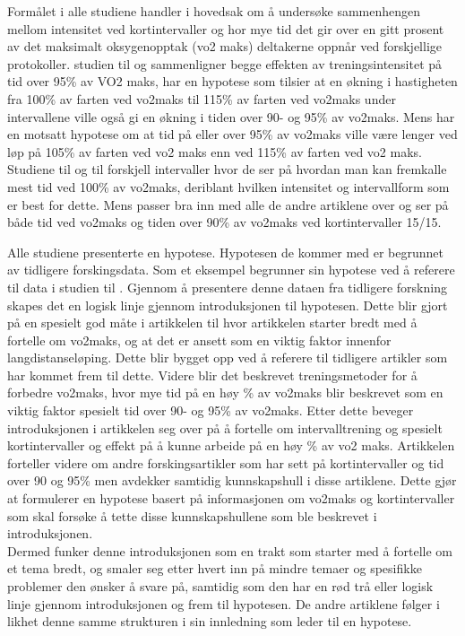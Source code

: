 \documentclass[
]{book}
\begin{document}
Formålet i alle studiene handler i hovedsak om å undersøke sammenhengen mellom intensitet ved kortintervaller og hor mye tid det gir over en gitt prosent av det maksimalt oksygenopptak (vo2 maks) deltakerne oppnår ved forskjellige protokoller. studien til \citet{thevenet2007} og \citet{wakefield2009} sammenligner begge effekten av treningsintensitet på tid over 95\% av VO2 maks, \citet{thevenet2007} har en hypotese som tilsier at en økning i hastigheten fra 100\% av farten ved vo2maks til 115\% av farten ved vo2maks under intervallene ville også gi en økning i tiden over 90- og 95\% av vo2maks. Mens \citet{wakefield2009} har en motsatt hypotese om at tid på eller over 95\% av vo2maks ville være lenger ved løp på 105\% av farten ved vo2 maks enn ved 115\% av farten ved vo2 maks. Studiene til \citet{billat2000} og \citet{billat2001} til forskjell intervaller hvor de ser på hvordan man kan fremkalle mest tid ved 100\% av vo2maks, deriblant hvilken intensitet og intervallform som er best for dette. Mens \citet{dupont2002} passer bra inn med alle de andre artiklene over og ser på både tid ved vo2maks og tiden over 90\% av vo2maks ved kortintervaller 15/15.

Alle studiene presenterte en hypotese. Hypotesen de kommer med er begrunnet av tidligere forskingsdata. Som et eksempel begrunner \citet{wakefield2009} sin hypotese ved å referere til data i studien til \citet{thevenet2007}. Gjennom å presentere denne dataen fra tidligere forskning skapes det en logisk linje gjennom introduksjonen til hypotesen. Dette blir gjort på en spesielt god måte i artikkelen til \citet{thevenet2007} hvor artikkelen starter bredt med å fortelle om vo2maks, og at det er ansett som en viktig faktor innenfor langdistanseløping. Dette blir bygget opp ved å referere til tidligere artikler som har kommet frem til dette. Videre blir det beskrevet treningsmetoder for å forbedre vo2maks, hvor mye tid på en høy \% av vo2maks blir beskrevet som en viktig faktor spesielt tid over 90- og 95\% av vo2maks. Etter dette beveger introduksjonen i artikkelen seg over på å fortelle om intervalltrening og spesielt kortintervaller og effekt på å kunne arbeide på en høy \% av vo2 maks. Artikkelen forteller videre om andre forskingsartikler som har sett på kortintervaller og tid over 90 og 95\% men avdekker samtidig kunnskapshull i disse artiklene. Dette gjør at \citet{thevenet2007} formulerer en hypotese basert på informasjonen om vo2maks og kortintervaller som skal forsøke å tette disse kunnskapshullene som ble beskrevet i introduksjonen.\\
Dermed funker denne introduksjonen som en trakt som starter med å fortelle om et tema bredt, og smaler seg etter hvert inn på mindre temaer og spesifikke problemer den ønsker å svare på, samtidig som den har en rød trå eller logisk linje gjennom introduksjonen og frem til hypotesen. De andre artiklene følger i likhet denne samme strukturen i sin innledning som leder til en hypotese.
\end{document}

